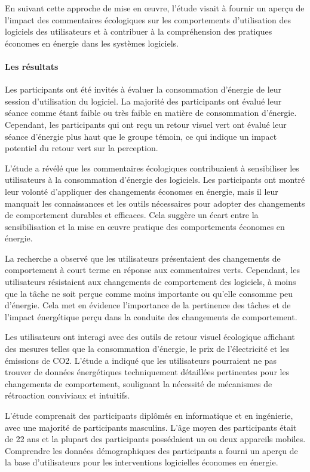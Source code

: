 En suivant cette approche de mise en œuvre, l'étude visait à fournir un aperçu de l'impact des commentaires écologiques sur les comportements d'utilisation des logiciels des utilisateurs et à contribuer à la compréhension des pratiques économes en énergie dans les systèmes logiciels.

\paragraph{Les résultats}
Les participants ont été invités à évaluer la consommation d'énergie de leur session d'utilisation du logiciel. La majorité des participants ont évalué leur séance comme étant faible ou très faible en matière de consommation d'énergie. Cependant, les participants qui ont reçu un retour visuel vert ont évalué leur séance d'énergie plus haut que le groupe témoin, ce qui indique un impact potentiel du retour vert sur la perception.

L’étude a révélé que les commentaires écologiques contribuaient à sensibiliser les utilisateurs à la consommation d’énergie des logiciels. Les participants ont montré leur volonté d’appliquer des changements économes en énergie, mais il leur manquait les connaissances et les outils nécessaires pour adopter des changements de comportement durables et efficaces. Cela suggère un écart entre la sensibilisation et la mise en œuvre pratique des comportements économes en énergie.

La recherche a observé que les utilisateurs présentaient des changements de comportement à court terme en réponse aux commentaires verts. Cependant, les utilisateurs résistaient aux changements de comportement des logiciels, à moins que la tâche ne soit perçue comme moins importante ou qu'elle consomme peu d'énergie. Cela met en évidence l’importance de la pertinence des tâches et de l’impact énergétique perçu dans la conduite des changements de comportement.

Les utilisateurs ont interagi avec des outils de retour visuel écologique affichant des mesures telles que la consommation d'énergie, le prix de l'électricité et les émissions de CO2. L'étude a indiqué que les utilisateurs pourraient ne pas trouver de données énergétiques techniquement détaillées pertinentes pour les changements de comportement, soulignant la nécessité de mécanismes de rétroaction conviviaux et intuitifs.

L’étude comprenait des participants diplômés en informatique et en ingénierie, avec une majorité de participants masculins. L'âge moyen des participants était de 22 ans et la plupart des participants possédaient un ou deux appareils mobiles. Comprendre les données démographiques des participants a fourni un aperçu de la base d'utilisateurs pour les interventions logicielles économes en énergie.

